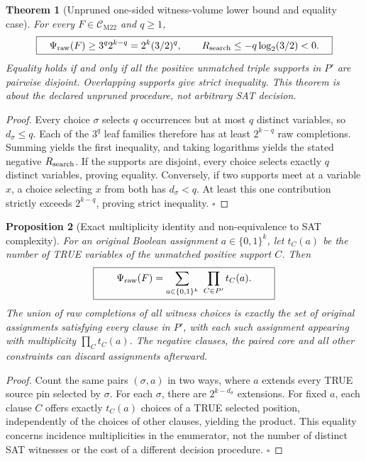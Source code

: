 \documentclass[11pt]{article}
\newtheorem{theorem}{Theorem}
\newtheorem{proposition}[theorem]{Proposition}
\newcommand{\CM}{\mathcal C_{\mathrm{M22}}}
\begin{document}
\begin{theorem}[Unpruned one-sided witness-volume lower bound and equality case]
For every \(F\in\CM\) and \(q\ge1\),
\[
\boxed{\quad
\Psi_{\rm raw}(F)\ge3^q2^{k-q}=2^k(3/2)^q,
\qquad R_{\rm search}\le-q\log_2(3/2)<0.
\quad}
\]
Equality holds if and only if all the positive unmatched triple supports in \(P'\) are pairwise disjoint. Overlapping supports give strict inequality. This theorem is about the declared unpruned procedure, not arbitrary SAT decision.
\end{theorem}
\begin{proof}
Every choice \(\sigma\) selects \(q\) occurrences but at most \(q\) distinct variables, so \(d_\sigma\le q\). Each of the \(3^q\) leaf families therefore has at least \(2^{k-q}\) raw completions. Summing yields the first inequality, and taking logarithms yields the stated negative \(R_{\rm search}\). If the supports are disjoint, every choice selects exactly \(q\) distinct variables, proving equality. Conversely, if two supports meet at a variable \(x\), a choice selecting \(x\) from both has \(d_\sigma<q\). At least this one contribution strictly exceeds \(2^{k-q}\), proving strict inequality. \(\square\)
\end{proof}

\begin{proposition}[Exact multiplicity identity and non-equivalence to SAT complexity]
For an original Boolean assignment \(a\in\{0,1\}^k\), let \(t_C(a)\) be the number of TRUE variables of the unmatched positive support \(C\). Then
\[
\boxed{\qquad\Psi_{\rm raw}(F)=
\sum_{a\in\{0,1\}^k}\ \prod_{C\in P'}t_C(a).\qquad}
\]
The union of raw completions of all witness choices is exactly the set of original assignments satisfying every clause in \(P'\), with each such assignment appearing with multiplicity \(\prod_Ct_C(a)\). The negative clauses, the paired core and all other constraints can discard assignments afterward.
\end{proposition}
\begin{proof}
Count the same pairs \((\sigma,a)\) in two ways, where \(a\) extends every TRUE source pin selected by \(\sigma\). For each \(\sigma\), there are \(2^{k-d_\sigma}\) extensions. For fixed \(a\), each clause \(C\) offers exactly \(t_C(a)\) choices of a TRUE selected position, independently of the choices of other clauses, yielding the product. This equality concerns incidence multiplicities in the enumerator, not the number of distinct SAT witnesses or the cost of a different decision procedure. \(\square\)
\end{proof}
\end{document}
